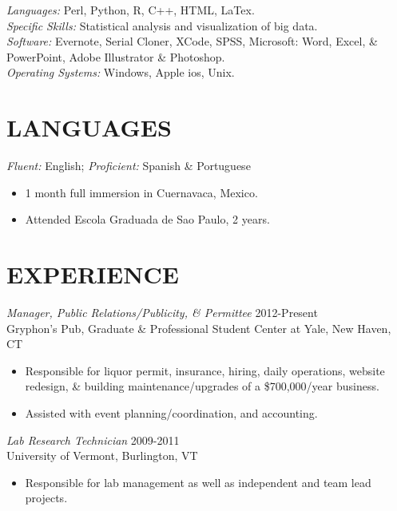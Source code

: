 \documentclass[margin, 10pt]{res} %
\begin{document}
\begin{resume}
{\sl Languages:} 
Perl, Python, R, C++, HTML, LaTex. \\
{\sl Specific Skills:} Statistical analysis and visualization of big data.\\
{\sl Software:} Evernote, Serial Cloner, XCode, SPSS, Microsoft: Word, Excel, \& PowerPoint, Adobe Illustrator \& Photoshop.\\  
{\sl Operating Systems:} Windows, Apple ios, Unix. 


\section{LANGUAGES} 
{\sl Fluent:} English; {\sl Proficient:} Spanish \& Portuguese 

\begin{itemize} \itemsep -2pt %
\item 1 month full immersion in Cuernavaca, Mexico.  
\item Attended Escola Graduada de Sao Paulo, 2 years.
\end{itemize}
 
\section{EXPERIENCE}

{\sl Manager, Public Relations/Publicity, \& Permittee} \hfill 2012-Present \\
Gryphon's Pub, Graduate \& Professional Student Center at Yale, New Haven, CT 

\begin{itemize} \itemsep -2pt %
\item Responsible for liquor permit, insurance, hiring, daily operations, website redesign, \& building maintenance/upgrades of a \$700,000/year business.    
\item Assisted with event planning/coordination, and accounting. 
\end{itemize}
 
{\sl Lab Research Technician} \hfill 2009-2011 \\
University of Vermont, Burlington, VT 
\begin{itemize} 
\item Responsible for lab management as well as independent and team lead projects.
\end{itemize} 


\end{resume}
\end{document}
